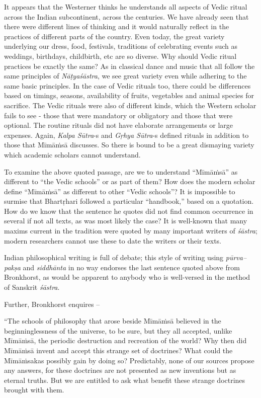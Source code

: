 It appears that the Westerner thinks he understands all aspects of Vedic ritual across the Indian subcontinent, across the centuries. We have already seen that there were different lines of thinking and it would naturally reflect in the practices of different parts of the country. Even today, the great variety underlying our dress, food, festivals, traditions of celebrating events such as weddings, birthdays, childbirth, etc are so diverse. Why should Vedic ritual practices be exactly the same? As in classical dance and music that all follow the same principles of \textit{Nāṭyaśāstra}, we see great variety even while adhering to the same basic principles. In the case of Vedic rituals too, there could be differences based on timings, seasons, availability of fruits, vegetables and animal species for sacrifice. The Vedic rituals were also of different kinds, which the Western scholar fails to see - those that were mandatory or obligatory and those that were optional. The routine rituals did not have elaborate arrangements or large expenses. Again, \textit{Kalpa Sūtra}-s and \textit{Gṛhya Sūtra}-s defined rituals in addition to those that Mīmāṁsā discusses. So there is bound to be a great dismaying variety which academic scholars cannot understand.

To examine the above quoted passage, are we to understand “Mīmāṁsā” as different to “the Vedic schools” or as part of them? How does the modern scholar define “Mīmāṁsā” as different to other “Vedic schools”? It is impossible to surmise that Bhartṛhari followed a particular “handbook,” based on a quotation. How do we know that the sentence he quotes did not find common occurrence in several if not all texts, as was most likely the case? It is well-known that many maxims current in the tradition were quoted by many important writers of \textit{śāstra}; modern researchers cannot use these to date the writers or their texts.

Indian philosophical writing is full of debate; this style of writing using \textit{pūrva--pakṣa} and \textit{siddhānta} in no way endorses the last sentence quoted above from Bronkhorst, as would be apparent to anybody who is well-versed in the method of Sanskrit \textit{śāstra}.

Further, Bronkhorst enquires –

\begin{myquote}
“The schools of philosophy that arose beside Mīmāṁsā believed in the beginninglessness of the universe, to be sure, but they all accepted, unlike Mīmāṁsā, the periodic destruction and recreation of the world? Why then did Mīmāṁsā invent and accept this strange set of doctrines? What could the Mīmāṁsakas possibly gain by doing so? Predictably, none of our sources propose any answers, for these doctrines are not presented as new inventions but as eternal truths. But we are entitled to ask what benefit these strange doctrines brought with them.
\end{myquote}

